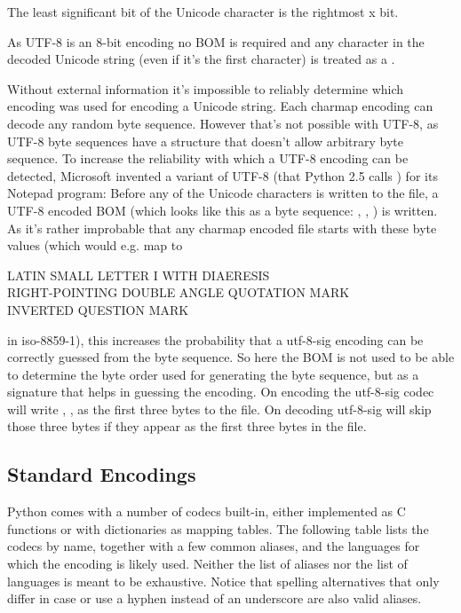 The least significant bit of the Unicode character is the rightmost x
bit.

As UTF-8 is an 8-bit encoding no BOM is required and any 
character in the decoded Unicode string (even if it's the first
character) is treated as a .

Without external information it's impossible to reliably determine
which encoding was used for encoding a Unicode string. Each charmap
encoding can decode any random byte sequence. However that's not
possible with UTF-8, as UTF-8 byte sequences have a structure that
doesn't allow arbitrary byte sequence. To increase the reliability
with which a UTF-8 encoding can be detected, Microsoft invented a
variant of UTF-8 (that Python 2.5 calls ) for its Notepad
program: Before any of the Unicode characters is written to the file,
a UTF-8 encoded BOM (which looks like this as a byte sequence: ,
, ) is written. As it's rather improbable that any
charmap encoded file starts with these byte values (which would e.g. map to

   LATIN SMALL LETTER I WITH DIAERESIS \\
   RIGHT-POINTING DOUBLE ANGLE QUOTATION MARK \\
   INVERTED QUESTION MARK

in iso-8859-1), this increases the probability that a utf-8-sig
encoding can be correctly guessed from the byte sequence. So here the
BOM is not used to be able to determine the byte order used for
generating the byte sequence, but as a signature that helps in
guessing the encoding. On encoding the utf-8-sig codec will write
, ,  as the first three bytes to the file.
On decoding utf-8-sig will skip those three bytes if they appear as the
first three bytes in the file.


\subsection{Standard Encodings\label{standard-encodings}}

Python comes with a number of codecs built-in, either implemented as C
functions or with dictionaries as mapping tables. The following table
lists the codecs by name, together with a few common aliases, and the
languages for which the encoding is likely used. Neither the list of
aliases nor the list of languages is meant to be exhaustive. Notice
that spelling alternatives that only differ in case or use a hyphen
instead of an underscore are also valid aliases.

